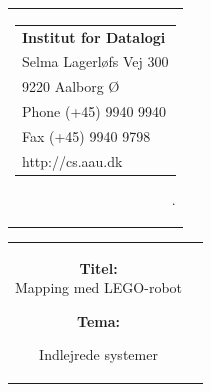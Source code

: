 \thispagestyle{empty}
\begin{titlepage}
\setlength{\textwidth}{15cm}
	\noindent
\begin{nopagebreak}
{\samepage 
\begin{tabular}{r}
	\parbox{15cm}{
	\hfill \parbox{7cm}{\begin{tabular}{l}
		{\small \textbf{Institut for Datalogi}}\\
		{\small Selma Lagerløfs Vej 300} \\
		{\small 9220 Aalborg Ø} \\
		{\small Phone (+45) 9940 9940} \\
		{\small Fax (+45) 9940 9798} \\
		{\small http://cs.aau.dk}
	\end{tabular}}
.	}
\end{tabular}

\begin{tabular}{cc}
	\parbox{8cm}{
	\begin{description}
		\item { \textbf{Titel:}}\\ 
			Mapping med LEGO-robot
    		\item { \textbf{Tema:}}\\ 
			\raggedright Indlejrede systemer
	\end{description}
	
}
\end{tabular}}
\end{nopagebreak}
\end{titlepage}
